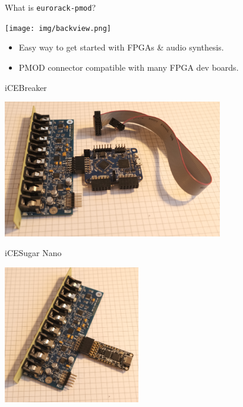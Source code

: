 \documentclass{beamer}
\begin{document}

\begin{frame}{What is \texttt{eurorack-pmod}?}

    \begin{center}
        \texttt{[image: img/backview.png]}
    \end{center}

    \begin{itemize}
        \item Easy way to get started with FPGAs \& audio synthesis.
        \item PMOD connector compatible with many FPGA dev boards.
    \end{itemize}

\end{frame}

\begin{frame}{iCEBreaker}

\begin{center}
    \includegraphics[height=6cm]{img/icebreaker.png}
\end{center}

\end{frame}

\begin{frame}{iCESugar Nano}

\begin{center}
    \includegraphics[height=6cm]{img/icesugar_nano.png}
\end{center}

\end{frame}
\end{document}
